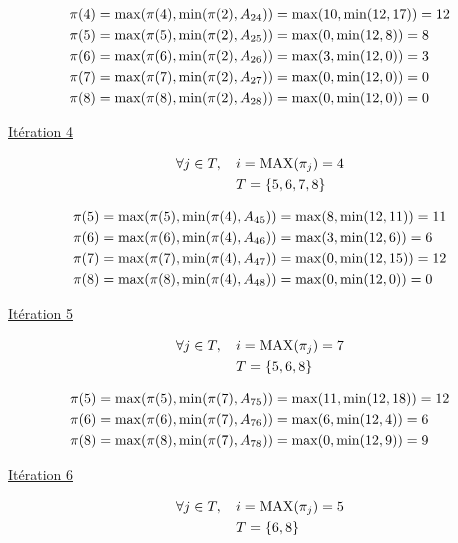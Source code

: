 \documentclass{article}
\begin{document}
\begin{align*}
&\pi(4) = \operatorname{max}(\pi(4), \operatorname{min}(\pi(2), A_{24})) = \operatorname{max}(10, \operatorname{min}(12,17)) = 12\\
&\pi(5) = \operatorname{max}(\pi(5), \operatorname{min}(\pi(2), A_{25})) = \operatorname{max}(0, \operatorname{min}(12,8)) = 8\\
&\pi(6) = \operatorname{max}(\pi(6), \operatorname{min}(\pi(2), A_{26})) = \operatorname{max}(3, \operatorname{min}(12,0)) = 3\\
&\pi(7) = \operatorname{max}(\pi(7), \operatorname{min}(\pi(2), A_{27})) = \operatorname{max}(0, \operatorname{min}(12,0)) = 0\\
&\pi(8) = \operatorname{max}(\pi(8), \operatorname{min}(\pi(2), A_{28})) = \operatorname{max}(0, \operatorname{min}(12,0)) = 0
\end{align*}

\underline{Itération 4}

\begin{align*}
  \forall j \in T,\;\;\;\; &i = \operatorname{MAX}(\pi_j) = 4\\
  &T = \{5,6,7,8\}
\end{align*}

\begin{align*}
&\pi(5) = \operatorname{max}(\pi(5), \operatorname{min}(\pi(4), A_{45})) = \operatorname{max}(8, \operatorname{min}(12,11)) = 11\\
&\pi(6) = \operatorname{max}(\pi(6), \operatorname{min}(\pi(4), A_{46})) = \operatorname{max}(3, \operatorname{min}(12,6)) = 6\\
&\pi(7) = \operatorname{max}(\pi(7), \operatorname{min}(\pi(4), A_{47})) = \operatorname{max}(0, \operatorname{min}(12,15)) = 12\\
&\pi(8) = \operatorname{max}(\pi(8), \operatorname{min}(\pi(4), A_{48})) = \operatorname{max}(0, \operatorname{min}(12,0)) = 0
\end{align*}

\underline{Itération 5}

\begin{align*}
  \forall j \in T,\;\;\;\; &i = \operatorname{MAX}(\pi_j) = 7\\
  &T = \{5,6,8\}
\end{align*}

\begin{align*}
&\pi(5) = \operatorname{max}(\pi(5), \operatorname{min}(\pi(7), A_{75})) = \operatorname{max}(11, \operatorname{min}(12,18)) = 12\\
&\pi(6) = \operatorname{max}(\pi(6), \operatorname{min}(\pi(7), A_{76})) = \operatorname{max}(6, \operatorname{min}(12,4)) = 6\\
&\pi(8) = \operatorname{max}(\pi(8), \operatorname{min}(\pi(7), A_{78})) = \operatorname{max}(0, \operatorname{min}(12,9)) = 9
\end{align*}

\underline{Itération 6}

\begin{align*}
  \forall j \in T,\;\;\;\; &i = \operatorname{MAX}(\pi_j) = 5\\
  &T = \{6,8\}
\end{align*}
\end{document}
